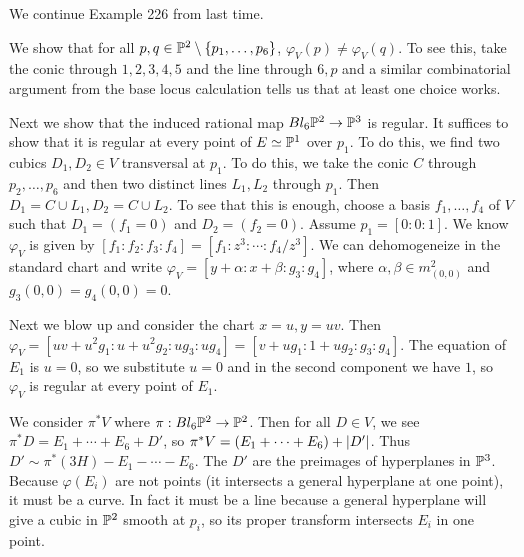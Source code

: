 \documentclass[twoside, 10pt]{article}
\begin{document}
        We continue Example 226 from last time.  \begin{exm*} We show that for all $p,q \in \P^2 \setminus \{p_1,
            \ldots, p_6 \}$, $\varphi_V(p) \neq \varphi_V(q)$. To see this,
            take the conic through $1,2,3,4,5$ and the line through $6,p$ and a
            similar combinatorial argument from the base locus calculation
            tells us that at least one choice works.

        Next we show that the induced rational map $Bl_6 \P^2 \to \P^3$ is
        regular. It suffices to show that it is regular at every point of $E
        \simeq \P^1$ over $p_1$. To do this, we find two cubics $D_1, D_2 \in
        V$ transversal at $p_1$. To do this, we take the conic $C$ through
        $p_2, \ldots, p_6$ and then two distinct lines $L_1, L_2$ through
        $p_1$. Then $D_1 = C \cup L_1, D_2 = C \cup L_2$. To see that this is
        enough, choose a basis $f_1, \ldots, f_4$ of $V$ such that $D_1 = (f_1
        = 0)$ and $D_2 = (f_2 = 0)$. Assume $p_1 = [0:0:1]$. We know
        $\varphi_V$ is given by $[f_1:f_2:f_3:f_4] = [f_1:z^3: \cdots :
        f_4/z^3]$. We can dehomogeneize in the standard chart and write
        $\varphi_V = [y + \alpha:x + \beta:g_3:g_4]$, where $\alpha,\beta \in
        m_{(0,0)}^2$ and $g_3(0,0) = g_4(0,0) = 0$. 

        Next we blow up and consider the chart $x=u,y=uv$. Then $\varphi_V =
        [uv+u^2g_1:u+u^2g_2:ug_3:ug_4] = [v+ug_1:1+ug_2:g_3:g_4]$. The equation
        of $E_1$ is $u=0$, so we substitute $u=0$ and in the second component
        we have $1$, so $\varphi_V$ is regular at every point of $E_1$.
    \end{exm*}

        \begin{rmk} We consider $\pi^* V$ where $\pi: Bl_6 \P^2 \to \P^2$. Then
            for all $D \in V$, we see $\pi^* D = E_1 + \cdots + E_6 + D'$, so
            $\pi^*V = (E_1 + \cdots + E_6) + \abs{D'}$. Thus $D' \sim \pi^*(3H)
            - E_1 - \cdots - E_6$. The $D'$ are the preimages of hyperplanes in
            $\P^3$.  Because $\varphi(E_i)$ are not points (it intersects a
            general hyperplane at one point), it must be a curve. In fact it
            must be a line because a general hyperplane will give a cubic in
            $\P^2$ smooth at $p_i$, so its proper transform intersects $E_i$ in
            one point.  \end{rmk}
\end{document}
